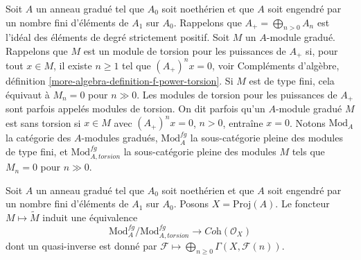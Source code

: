 \noindent
Soit $A$ un anneau gradué tel que $A_0$ soit noethérien et que $A$ soit engendré
par un nombre fini d'éléments de $A_1$ sur $A_0$. Rappelons que
$A_+ = \bigoplus_{n > 0} A_n$ est l'idéal des éléments de degré strictement
positif. Soit $M$ un $A$-module gradué. Rappelons que
$M$ est un module de torsion pour les puissances de $A_+$ si, pour tout $x \in M$,
il existe $n \geq 1$ tel que $(A_+)^n x = 0$, voir
Compléments d'algèbre, définition \ref{more-algebra-definition-f-power-torsion}.
Si $M$ est de type fini,
cela équivaut à $M_n = 0$ pour $n \gg 0$. Les modules de
torsion pour les puissances de $A_+$ sont parfois appelés modules de torsion. On
dit parfois qu'un $A$-module gradué $M$ est sans torsion si
$x \in M$ avec $(A_+)^n x = 0$, $n > 0$, entraîne $x = 0$.
Notons $\text{Mod}_A$ la catégorie des $A$-modules gradués,
$\text{Mod}^{fg}_A$ la sous-catégorie pleine des modules de type fini,
et $\text{Mod}^{fg}_{A, torsion}$ la sous-catégorie pleine des
modules $M$ tels que $M_n = 0$ pour $n \gg 0$.

\begin{proposition}
\label{proposition-coherent-modules-on-proj}
Soit $A$ un anneau gradué tel que $A_0$ soit noethérien et que $A$ soit engendré
par un nombre fini d'éléments de $A_1$ sur $A_0$.
Posons $X = \text{Proj}(A)$. Le foncteur $M \mapsto \widetilde M$
induit une équivalence
$$
\text{Mod}^{fg}_A/\text{Mod}^{fg}_{A, torsion}
\longrightarrow
\textit{Coh}(\mathcal{O}_X)
$$
dont un quasi-inverse est donné par
$\mathcal{F} \longmapsto \bigoplus_{n \geq 0} \Gamma(X, \mathcal{F}(n))$.
\end{proposition}

